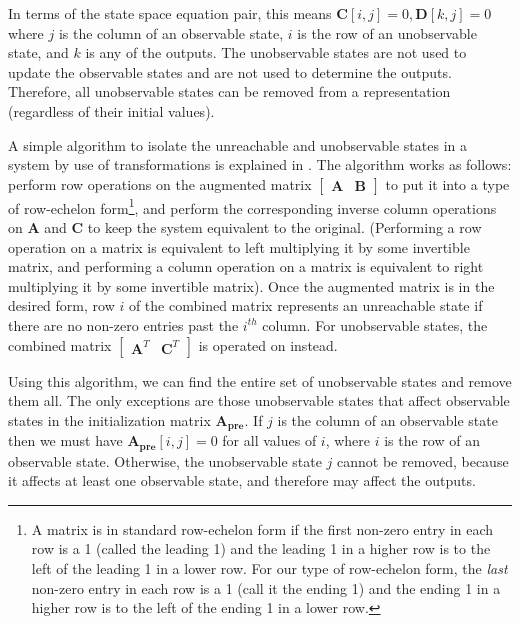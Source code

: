 In terms of the state space equation pair, this means $\mathbf{C}[i,j]
= 0, \mathbf{D}[k,j] = 0$ where $j$ is the column of an observable
state, $i$ is the row of an unobservable state, and $k$ is any of the
outputs.  The unobservable states are not used to update the
observable states and are not used to determine the
outputs. Therefore, all unobservable states can be removed from a
representation (regardless of their initial values).

A simple algorithm to isolate the unreachable and unobservable states
in a system by use of transformations is explained in
\cite{Mayne}. The algorithm works as follows: perform row
operations on the augmented matrix $\left [ \begin{array} {cc}
\mathbf{A} & \mathbf{B} \end{array} \right ]$ to put it into a
type of row-echelon form\footnote{A matrix is in standard row-echelon
form if the first non-zero entry in each row is a 1 (called the
leading 1) and the leading 1 in a higher row is to the left of the
leading 1 in a lower row. For our type of row-echelon form, the
\emph{last} non-zero entry in each row is a 1 (call it the ending 1)
and the ending 1 in a higher row is to the left of the ending 1 in a
lower row.}, and perform the corresponding inverse column operations
on $\mathbf{A}$ and $\mathbf{C}$ to keep the system equivalent to the
original. (Performing a row operation on a matrix is equivalent to
left multiplying it by some invertible matrix, and performing a column
operation on a matrix is equivalent to right multiplying it by some
invertible matrix).  Once the augmented matrix is in the desired form,
row $i$ of the combined matrix represents an unreachable state if
there are no non-zero entries past the $i^{th}$ column. For
unobservable states, the combined matrix $\left [ \begin{array} {cc}
\mathbf{A}^T & \mathbf{C}^T
\end{array} \right ]$ is operated on instead.

Using this algorithm, we can find the entire set of unobservable
states and remove them all. The only exceptions are those unobservable
states that affect observable states in the initialization matrix
$\mathbf{A_{pre}}$. If $j$ is the column of an observable state then
we must have $\mathbf{A_{pre}}[i,j] = 0$ for all values of $i$, where
$i$ is the row of an observable state. Otherwise, the unobservable
state $j$ cannot be removed, because it affects at least one
observable state, and therefore may affect the outputs.

